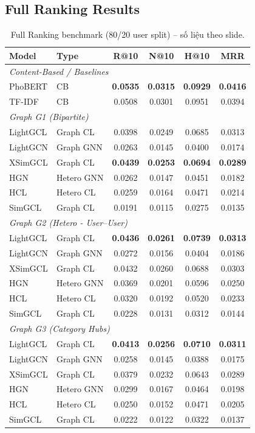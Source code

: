 \documentclass[11pt]{article}
\begin{document}
\subsection{Full Ranking Results}
\begin{table}[t]
\centering
\scriptsize
\setlength{\tabcolsep}{3pt}
\renewcommand{\arraystretch}{1.02}
\begin{tabular}{l l c c c c}
\toprule
\textbf{Model} & \textbf{Type} & \textbf{R@10} & \textbf{N@10} & \textbf{H@10} & \textbf{MRR} \\
\midrule
\multicolumn{6}{l}{\textit{Content-Based / Baselines}}\\
PhoBERT & CB & \textbf{0.0535} & \textbf{0.0315} & \textbf{0.0929} & \textbf{0.0416} \\
TF-IDF  & CB & 0.0508 & 0.0301 & 0.0951 & 0.0394 \\
\midrule
\multicolumn{6}{l}{\textit{Graph G1 (Bipartite)}}\\
LightGCL  & Graph CL & 0.0398 & 0.0249 & 0.0685 & 0.0313 \\
LightGCN  & Graph GNN& 0.0263 & 0.0145 & 0.0400 & 0.0174 \\
XSimGCL   & Graph CL & \textbf{0.0439} & \textbf{0.0253} & \textbf{0.0694} & \textbf{0.0289} \\
HGN       & Hetero GNN & 0.0262 & 0.0147 & 0.0451 & 0.0182 \\
HCL       & Hetero CL  & 0.0259 & 0.0164 & 0.0471 & 0.0214 \\
SimGCL    & Graph CL & 0.0191 & 0.0115 & 0.0275 & 0.0135 \\
\midrule
\multicolumn{6}{l}{\textit{Graph G2 (Hetero - User--User)}}\\
LightGCL  & Graph CL & \textbf{0.0436} & \textbf{0.0261} & \textbf{0.0739} & \textbf{0.0313} \\
LightGCN  & Graph GNN& 0.0272 & 0.0156 & 0.0404 & 0.0186 \\
XSimGCL   & Graph CL & 0.0432 & 0.0260 & 0.0688 & 0.0303 \\
HGN       & Hetero GNN & 0.0369 & 0.0201 & 0.0596 & 0.0250 \\
HCL       & Hetero CL  & 0.0320 & 0.0192 & 0.0520 & 0.0233 \\
SimGCL    & Graph CL & 0.0228 & 0.0131 & 0.0312 & 0.0144 \\
\midrule
\multicolumn{6}{l}{\textit{Graph G3 (Category Hubs)}}\\
LightGCL  & Graph CL & \textbf{0.0413} & \textbf{0.0256} & \textbf{0.0710} & \textbf{0.0311} \\
LightGCN  & Graph GNN& 0.0258 & 0.0145 & 0.0388 & 0.0175 \\
XSimGCL   & Graph CL & 0.0379 & 0.0232 & 0.0643 & 0.0289 \\
HGN       & Hetero GNN & 0.0299 & 0.0167 & 0.0464 & 0.0198 \\
HCL       & Hetero CL  & 0.0250 & 0.0152 & 0.0471 & 0.0205 \\
SimGCL    & Graph CL & 0.0222 & 0.0122 & 0.0322 & 0.0137 \\
\bottomrule
\end{tabular}
\caption{Full Ranking benchmark (80/20 user split) -- số liệu theo slide.}
\label{tab:full-ranking}
\end{table}
\end{document}
